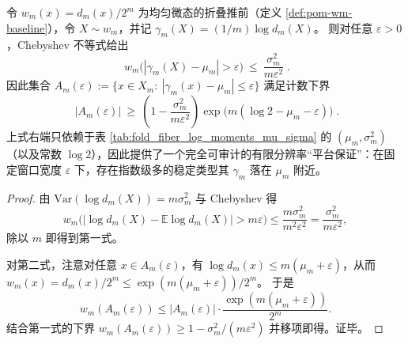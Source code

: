 \begin{proposition}\label{prop:pom-spectrum-finite-m-plateau}
令 \(w_m(x)=d_m(x)/2^m\) 为均匀微态的折叠推前（定义 \ref{def:pom-wm-baseline}），令 \(X\sim w_m\)，并记
\(
\gamma_m(X)=(1/m)\log d_m(X)
\)。
则对任意 \(\varepsilon>0\)，Chebyshev 不等式给出
\[
\boxed{\;
w_m\!\bigl(|\gamma_m(X)-\mu_m|>\varepsilon\bigr)\ \le\ \frac{\sigma_m^2}{m\varepsilon^2}\; }.
\]
因此集合
\(
A_m(\varepsilon):=\{x\in X_m:\ |\gamma_m(x)-\mu_m|\le \varepsilon\}
\)
满足计数下界
\[
\boxed{\;
|A_m(\varepsilon)|
\ \ge\
\left(1-\frac{\sigma_m^2}{m\varepsilon^2}\right)
\exp\!\bigl(m(\log 2-\mu_m-\varepsilon)\bigr)\; }.
\]
上式右端只依赖于表 \ref{tab:fold_fiber_log_moments_mu_sigma} 的 \((\mu_m,\sigma_m^2)\)（以及常数 \(\log 2\)），因此提供了一个完全可审计的有限分辨率“平台保证”：在固定窗口宽度 \(\varepsilon\) 下，存在指数级多的稳定类型其 \(\gamma_m\) 落在 \(\mu_m\) 附近。
\end{proposition}
\begin{proof}
由 \(\mathrm{Var}(\log d_m(X))=m\sigma_m^2\) 与 Chebyshev 得
\[
w_m\bigl(|\log d_m(X)-\mathbb{E}\log d_m(X)|>m\varepsilon\bigr)
\le \frac{m\sigma_m^2}{m^2\varepsilon^2}
=\frac{\sigma_m^2}{m\varepsilon^2},
\]
除以 \(m\) 即得到第一式。
\par
对第二式，注意对任意 \(x\in A_m(\varepsilon)\)，有
\(
\log d_m(x)\le m(\mu_m+\varepsilon)
\)，从而
\(
w_m(x)=d_m(x)/2^m\le \exp(m(\mu_m+\varepsilon))/2^m
\)。
于是
\[
w_m(A_m(\varepsilon))
\le |A_m(\varepsilon)|\cdot \frac{\exp(m(\mu_m+\varepsilon))}{2^m}.
\]
结合第一式的下界 \(w_m(A_m(\varepsilon))\ge 1-\sigma_m^2/(m\varepsilon^2)\) 并移项即得。证毕。
\end{proof}

